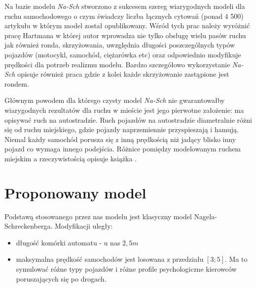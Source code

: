 \documentclass[a4paper,12pt]{article}
\begin{document}
	\newpage			
			
			Na bazie modelu \textit{Na-Sch} stworzono z sukcesem szereg wiarygodnych modeli dla ruchu samochodowego o czym świadczy liczba łącznych cytowań (ponad 4 500) artykułu w którym model został opublikowany. Wśród tych prac należy wyróżnić pracę Hartmana \cite{hartman2004head} w której autor wprowadza nie tylko obsługę wielu pasów ruchu jak również ronda, skrzyżowania, uwzględnia długości poszczególnych typów pojazdów (motocykl, samochód, ciężarówka etc) oraz odpowiednio modyfikuje prędkości dla potrzeb realizmu modelu. Bardzo szczegółowo wykorzystanie \textit{Na-Sch} opisuje również praca \cite{regragui2018cellular} gdzie z kolei każde skrzyżowanie zastąpione jest rondem.
			
			Głównym powodem dla którego czysty model \textit{Na-Sch} nie gwarantowałby wiarygodnych rezultatów dla ruchu w mieście jest jego pierwotne założenie: ma opisywać ruch na autostradzie. Ruch pojazdów na autostradzie diametralnie różni się od ruchu miejskiego, gdzie pojazdy naprzemiennie przyspieszają i hamują. Niemal każdy samochód porusza się z inną prędkością niż jadący blisko inny pojazd co wymaga innego podejścia. Różnice pomiędzy modelowanym ruchem miejskim a rzeczywistością opisuje książka \cite{wagner1995traffic}.

\section{Proponowany model}

Podstawą stosowanego przez nas modelu jest klasyczny model Nagela-Schreckenberga. Modyfikacji uległy:

\begin{itemize}
	\item długość komórki automatu - u nas $ 2,5 m$
	\item maksymalna prędkość samochodów  jest losowana z przedziału $[3;5]$. Ma to symulować różne typy pojazdów i różne profile psychologiczne kierowców poruszających się po drogach.
\end{itemize}
\end{document}
